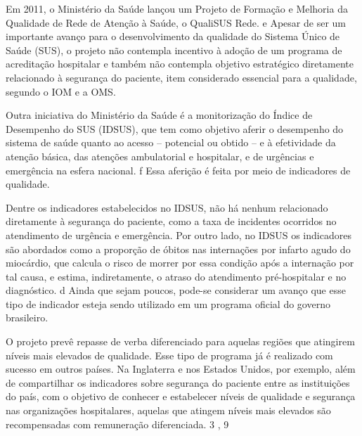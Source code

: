 \documentclass{article}
\begin{document}
Em 2011, o Ministério da Saúde lançou um Projeto de Formação e Melhoria da Qualidade de
        Rede de Atenção à Saúde, o QualiSUS Rede. %
e%
 Apesar de ser um importante avanço para o desenvolvimento da qualidade do Sistema
        Único de Saúde (SUS), o projeto não contempla incentivo à adoção de um programa de
        acreditação hospitalar e também não contempla objetivo estratégico diretamente relacionado à
        segurança do paciente, item considerado essencial para a qualidade, segundo o IOM e a
        OMS.

Outra iniciativa do Ministério da Saúde é a monitorização do Índice de Desempenho do SUS
        (IDSUS), que tem como objetivo aferir o desempenho do sistema de saúde quanto ao acesso –
        potencial ou obtido – e à efetividade da atenção básica, das atenções ambulatorial e
        hospitalar, e de urgências e emergência na esfera nacional. %
f%
 Essa aferição é feita por meio de indicadores de qualidade.

Dentre os indicadores estabelecidos no IDSUS, não há nenhum relacionado diretamente à
        segurança do paciente, como a taxa de incidentes ocorridos no atendimento de urgência e
        emergência. Por outro lado, no IDSUS os indicadores são abordados como a proporção de óbitos
        nas internações por infarto agudo do miocárdio, que calcula o risco de morrer por essa
        condição após a internação por tal causa, e estima, indiretamente, o atraso do atendimento
        pré-hospitalar e no diagnóstico. %
d%
 Ainda que sejam poucos, pode-se considerar um avanço que esse tipo de indicador
        esteja sendo utilizado em um programa oficial do governo brasileiro.

O projeto prevê repasse de verba diferenciado para aquelas regiões que atingirem níveis
        mais elevados de qualidade. Esse tipo de programa já é realizado com sucesso em outros
        países. Na Inglaterra e nos Estados Unidos, por exemplo, além de compartilhar os indicadores
        sobre segurança do paciente entre as instituições do país, com o objetivo de conhecer e
        estabelecer níveis de qualidade e segurança nas organizações hospitalares, aquelas que
        atingem níveis mais elevados são recompensadas com remuneração diferenciada. %
3%
,%
9%
\end{document}
